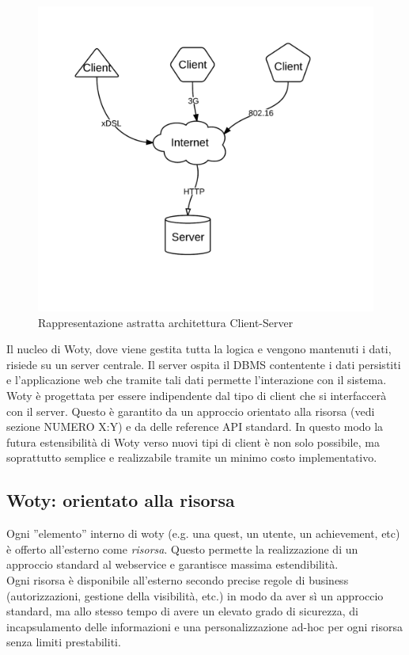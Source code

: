 \begin{center}
\begin{figure}[ht]
\centering
\includegraphics[scale=0.55]{images/Client-server.png}
\caption{Rappresentazione astratta architettura Client-Server}
\end{figure}
\end{center}

Il nucleo di Woty, dove viene gestita tutta la logica e vengono mantenuti i dati, risiede su un server centrale. Il server ospita il DBMS contentente i dati persistiti e l'applicazione web che tramite tali dati permette l'interazione con il sistema.\\
Woty è progettata per essere indipendente dal tipo di client che si interfaccerà con il server. Questo è garantito da un approccio orientato alla risorsa (vedi sezione NUMERO X:Y) e da delle reference API standard. In questo modo la futura estensibilità di Woty verso nuovi tipi di client è non solo possibile, ma soprattutto semplice e realizzabile tramite un minimo costo implementativo.\\


\subsection{Woty: orientato alla risorsa}
Ogni ''elemento'' interno di woty (e.g. una quest, un utente, un achievement, etc) è offerto all'esterno come \emph{risorsa}. Questo permette la realizzazione di un approccio standard al webservice e garantisce massima estendibilità. \\
Ogni risorsa è disponibile all'esterno secondo precise regole di business (autorizzazioni, gestione della visibilità, etc.) in modo da aver sì un approccio standard, ma allo stesso tempo di avere un elevato grado di sicurezza, di incapsulamento delle informazioni e una personalizzazione ad-hoc per ogni risorsa senza limiti prestabiliti.


